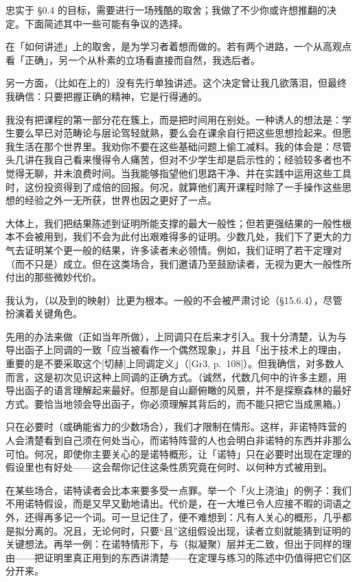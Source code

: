 忠实于 \S0.4 的目标，需要进行一场残酷的取舍；我做了不少你或许想推翻的决定。下面简述其中一些可能有争议的选择。

在「如何讲述」上的取舍，是为学习者着想而做的。若有两个进路，一个从高观点看「正确」，另一个从朴素的立场看直接而自然，我选后者。

另一方面，\trVarietyTheory{}（比如在\trAlgClosedField{}上的）没有先行单独讲述。这个决定曾让我几欲落泪，但最终我确信：只要把握正确的精神，它是行得通的。

我没有把课程的第一部分花在簇上，而是把时间用在别处。一种诱人的想法是：学生要么早已对范畴论与层论驾轻就熟，要么会在课余自行把这些思想捡起来。但愿我生活在那个世界里。我劝你不要在这些基础问题上偷工减料。我的体会是：尽管头几讲在我自己看来慢得令人痛苦，但对不少学生却是启示性的；经验较多者也不觉得无聊，并未浪费时间。当我能够指望他们思路干净、并在实践中运用这些工具时，这份投资得到了成倍的回报。何况，就算他们离开课程时除了一手操作这些思想的经验之外一无所获，世界也因之更好了一点。

大体上，我们把结果陈述到证明所能支撑的最大一般性；但若更强结果的一般性根本不会被用到，我们不会为此付出艰难得多的证明。少数几处，我们下了更大的力气去证明某个更一般的结果，许多读者未必领情。例如，我们证明了若干定理对\trProper\trMorphism{}（而不只是\trProjective\trMorphism）成立。但在这类场合，我们邀请乃至鼓励读者，无视为更大一般性所付出的那些微妙代价。

我认为，\trLineBundle{}（以及到\trProjectiveSpace{}的映射）比\trDivisor{}更为根本。一般的\trCartierDivisor{}不会被严肃讨论（\S15.6.4），尽管\trEffectiveDivisor{}扮演着关键角色。

\trCohomology{}先用\trCech{}的办法来做（正如\trSerre{}当年所做），\trDerivedFunctor{}上同调只在后来才引入。我十分清楚，\trGrothendieck{}认为\trCechCohomology{}与导出函子上同调的一致「应当被看作一个偶然现象」，并且「出于技术上的理由，重要的是不要采取这个[切赫]上同调定义」（[Gr3, p.~108]）。但我确信，对多数人而言，这是初次见识这种上同调的正确方式。（诚然，代数几何中的许多主题，用导出函子的语言理解起来最好。但那是自山巅俯瞰的风景，并不是探察森林的最好方式。要恰当地领会导出函子，你必须理解其背后的\trHomologicalAlgebra，而不能只把它当成黑箱。）

只在必要时（或确能省力的少数场合），我们才限制在\trNoetherian{}情形。这样，非诺特阵营的人会清楚看到自己须在何处当心，而诺特阵营的人也会明白非诺特的东西并非那么可怕。何况，即使你主要关心的是诺特概形，让「诺特」只在必要时出现在定理的假设里也有好处——这会帮你记住这条性质究竟在何时、以何种方式被用到。

在某些场合，诺特读者会比本来要多受一点罪。举一个「火上浇油」的例子：我们不用诺特假设，而是又早又勤地请出\trQuasiseparatedness。代价是，在一大堆已令人应接不暇的词语之外，还得再多记一个词。可一旦记住了，便不难想到：凡有人关心的概形，几乎都是拟分离的。况且，无论何时，只要“\trQuasicompact{}且\trQuasiSeparated”这组假设出现，读者立刻就能猜到证明的关键想法。再举一例：在诺特情形下，\trCoherentSheaf{}与\trFiniteType{}（拟凝聚）层并无二致，但出于同样的理由——把证明里真正用到的东西讲清楚——在定理与练习的陈述中仍值得把它们区分开来。

